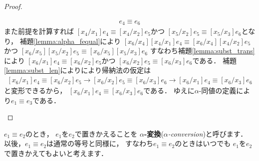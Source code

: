 \documentclass{ltjsbook}%
\newcommand\lemmaname{補題}%
\newcommand\term[2]{\textbf{#1}{(\textit{#2})}}%
\begin{document}
\begin{proof}
\begin{itemize}
\begin{itemize}
\begin{align}
    \mathit{e}_4\equiv\mathit{e}_6%
    \end{align}%
    また前提を計算すれば%
    ${}[\mathit{x}_4/\mathit{x}_1]\mathit{e}_4%
    \equiv{}[\mathit{x}_4/\mathit{x}_2]\mathit{e}_5$かつ%
    ${}[\mathit{x}_5/\mathit{x}_2]\mathit{e}_5%
    \equiv{}[\mathit{x}_5/\mathit{x}_3]\mathit{e}_6$となり，%
    \lemmaname\ref{lemma:alpha_fequal}により%
    ${}[\mathit{x}_6/\mathit{x}_4]{}[\mathit{x}_4/\mathit{x}_1]\mathit{e}_4%
    \equiv{}[\mathit{x}_6/\mathit{x}_4][\mathit{x}_4/\mathit{x}_2]\mathit{e}_5$%
    かつ%
    ${}[\mathit{x}_6/\mathit{x}_5]{}[\mathit{x}_5/\mathit{x}_2]\mathit{e}_5%
    \equiv{}[\mathit{x}_6/\mathit{x}_5][\mathit{x}_5/\mathit{x}_3]\mathit{e}_6$%
    すなわち\lemmaname\ref{lemma:subst_trans}により%
    ${}[\mathit{x}_6/\mathit{x}_1]\mathit{e}_4%
    \equiv{}[\mathit{x}_6/\mathit{x}_2]\mathit{e}_5$かつ%
    ${}[\mathit{x}_6/\mathit{x}_2]\mathit{e}_5%
    \equiv{}[\mathit{x}_6/\mathit{x}_3]\mathit{e}_6$である．%
    \lemmaname\ref{lemma:subst_len}によりにより帰納法の仮定は%
    \begin{align}%
    {}[\mathit{x}_6/\mathit{x}_1]\mathit{e}_4%
    \equiv{}[\mathit{x}_6/\mathit{x}_2]\mathit{e}_5%
    \rightarrow%
    {}[\mathit{x}_6/\mathit{x}_2]\mathit{e}_5%
    \equiv{}[\mathit{x}_6/\mathit{x}_3]\mathit{e}_6%
    \rightarrow%
    {}[\mathit{x}_6/\mathit{x}_1]\mathit{e}_4%
    \equiv{}[\mathit{x}_6/\mathit{x}_3]\mathit{e}_6%
    \end{align}%
    と変形できるから，%
    ${}[\mathit{x}_6/\mathit{x}_1]\mathit{e}_4%
    \equiv{}[\mathit{x}_6/\mathit{x}_3]\mathit{e}_6$である．%
    ゆえに$\alpha$-同値の定義により$\mathit{e}_1\equiv \mathit{e}_3$である．%
  \end{itemize}%
  \end{itemize}%
\end{proof}%
\par$\mathit{e}_1\equiv\mathit{e}_2$のとき，%
$\mathit{e}_1$を$\mathit{e}_2$で置きかえることを%
\term{$\alpha$-変換}{$\alpha$-conversion}と呼びます．%
以後，$\mathit{e}_1\equiv\mathit{e}_2$は通常の等号と同様に，%
すなわち$\mathit{e}_1\equiv\mathit{e}_2$のときはいつでも%
$\mathit{e}_1$を$\mathit{e}_2$で置きかえてもよいと考えます．%
\end{document}
